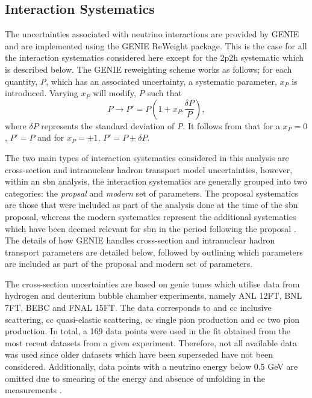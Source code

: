 \subsection{Interaction Systematics}\label{sec:interaction_syst}
The uncertainties associated with neutrino interactions are provided by GENIE and are implemented using the GENIE ReWeight package. This is the case for all the interaction systematics considered here except for the \gls{2p2h} systematic which is described below. The GENIE reweighting scheme works as follows; for each quantity, \textit{P}, which has an associated uncertainty, a systematic parameter, $x_P$ is introduced. Varying $x_P$ will modify, \textit{P} such that
\begin{equation}
    P \rightarrow P' = P (1 + x_P . \frac{\delta P}{P}),
\label{eqn:genie_reweight}
\end{equation}
where $\delta P$ represents the standard deviation of \textit{P}. It follows from  that for a $x_P = 0$, $P' = P$ and for $x_P = \pm 1$, $P' = P \pm \delta P$.

The two main types of interaction systematics considered in this analysis are cross-section and intranuclear hadron transport model uncertainties, however, within an \gls{sbn} analysis, the interaction systematics are generally grouped into two categories: the \textit{propsal} and \textit{modern} set of parameters. The proposal systematics are those that were included as part of the analysis done at the time of the \gls{sbn} proposal, whereas the modern systematics represent the additional systematics which have been deemed relevant for \gls{sbn} in the period following the proposal \cite{SBN_Proposal}. The details of how GENIE handles cross-section and intranuclear hadron transport parameters are detailed below, followed by outlining which parameters are included as part of the proposal and modern set of parameters.

The cross-section uncertainties are based on \gls{genie} tunes which utilise data from hydrogen and deuterium bubble chamber experiments, namely ANL 12FT, BNL 7FT, BEBC and FNAL 15FT. The data corresponds to \numu and \numubar \gls{cc} inclusive scattering, \gls{cc} quasi-elastic scattering, \gls{cc} single pion production and \numu \gls{cc} two pion production. In total, a 169 data points were used in the fit obtained from the most recent datasets from a given experiment. Therefore, not all available data was used since older datasets which have been superseded have not been considered. Additionally, data points with a neutrino energy below 0.5 GeV are omitted due to smearing of the energy and absence of unfolding in the measurements \cite{GENIE_tune}.

